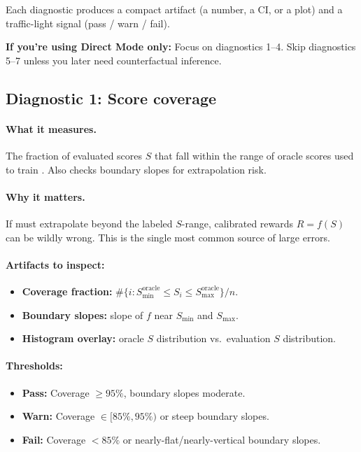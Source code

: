 Each diagnostic produces a compact artifact (a number, a CI, or a plot) and a traffic-light signal (pass / warn / fail).

\textbf{If you're using Direct Mode only:} Focus on diagnostics 1--4. Skip diagnostics 5--7 unless you later need counterfactual inference.

\subsection{Diagnostic 1: Score coverage}

\paragraph{What it measures.} The fraction of evaluated scores $S$ that fall within the range of oracle scores used to train \autocal. Also checks boundary slopes for extrapolation risk.

\paragraph{Why it matters.} If \autocal{} must extrapolate beyond the labeled $S$-range, calibrated rewards $R = f(S)$ can be wildly wrong. This is the single most common source of large errors.

\paragraph{Artifacts to inspect:}
\begin{itemize}
\item \textbf{Coverage fraction:} $\#\{i : S_{\min}^{\text{oracle}} \le S_i \le S_{\max}^{\text{oracle}}\} / n$.
\item \textbf{Boundary slopes:} slope of $f$ near $S_{\min}$ and $S_{\max}$.
\item \textbf{Histogram overlay:} oracle $S$ distribution vs.\ evaluation $S$ distribution.
\end{itemize}

\paragraph{Thresholds:}
\begin{itemize}
\item \textbf{Pass:} Coverage $\ge 95\%$, boundary slopes moderate.
\item \textbf{Warn:} Coverage $\in [85\%, 95\%)$ or steep boundary slopes.
\item \textbf{Fail:} Coverage $< 85\%$ or nearly-flat/nearly-vertical boundary slopes.
\end{itemize}

